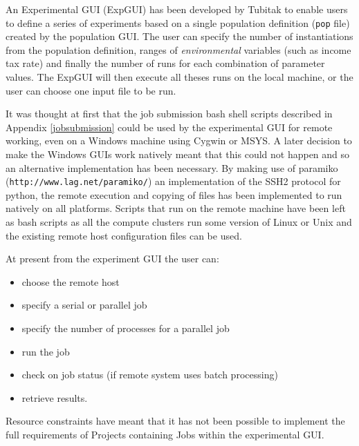 
An Experimental GUI (ExpGUI) has been developed by Tubitak to enable users to define a series of experiments based on a single population definition (\texttt{pop} file) created by the population GUI. The user can specify the number of instantiations from the population definition, ranges of \textsl{environmental} variables (such as income tax rate) and finally the number of runs for each combination of parameter values. The ExpGUI will then execute all theses runs on the local machine, or the user can choose one input file to be run.

It was thought at first that the job submission bash shell scripts described in Appendix \ref{jobsubmission} could be used by the experimental GUI for remote working, even on a Windows machine using Cygwin or MSYS. A later decision to make the Windows GUIs work natively meant that this could not happen and so an alternative implementation has been necessary. By making use of paramiko (\verb+http://www.lag.net/paramiko/+) an implementation of the SSH2 protocol for python, the remote execution and copying of files has been implemented to run natively on all platforms.  Scripts that run on the remote machine have been left as bash scripts as all the compute clusters run some version of Linux or Unix and the existing remote host configuration files can be used. 

At present from the experiment GUI the user can:

\begin{itemize}
\item choose the remote host
\item specify a serial or parallel job
\item specify the number of processes for a parallel job
\item run the job
\item check on job status (if remote system uses batch processing)
\item retrieve results.
\end{itemize}

Resource constraints have meant that it has not been possible to implement the full requirements of Projects containing Jobs within the experimental GUI.

